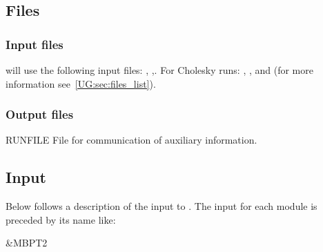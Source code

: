 \subsection{Files}
\label{UG:sec:mbpt2_files}

\subsubsection{Input files}
 will use the following input
files: , ,.
For Cholesky runs: , ,  and
(for more information see~\ref{UG:sec:files_list}).


%
%

\subsubsection{Output files}

\begin{filelist}
\item[RUNFILE]
File for communication of auxiliary information.
\end{filelist}

\subsection{Input}
\label{UG:sec:mbpt2_input}
Below follows a description of the input to .
The input for each module is preceded by its name like:
\begin{inputlisting}
 &MBPT2
\end{inputlisting}


